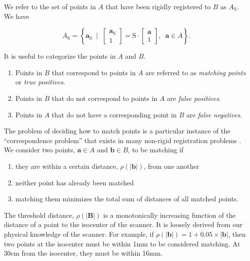 \documentclass[12pt]{article}
\begin{document}
We refer to the set of points in $A$ that have been rigidly registered to $B$ as $A_\textrm{S}$.  We have

\begin{equation*}
    A_\textrm{S} = \left\{ \mathbf{a}_\textrm{S} \;\; \Big| \;\; \begin{bmatrix} \mathbf{a}_\textrm{S} \\ 1 \end{bmatrix} = \mathrm{S} \cdot \begin{bmatrix} \mathbf{a} \\ 1 \end{bmatrix} , \;\; \mathbf{a} \in A \right\}.
\end{equation*}

It is useful to categorize the points in $A$ and $B$.

\begin{enumerate}
    \item Points in $B$ that correspond to points in $A$ are referred to as \textit{matching points} or \textit{true positives}.
    \item Points in $B$ that do not correspond to points in $A$ are \textit{false positives}.
    \item Points in $A$ that do not have a corresponding point in $B$ are \textit{false negatives}.
\end{enumerate}

The problem of deciding how to match points is a particular instance of the ``correspondence problem'' that exists in many non-rigid registration problems \cite{hill2001}.  We consider two points, $\textbf{a} \in A$ and $\textbf{b} \in B$, to be matching if

\begin{enumerate}
    \item they are within a certain distance, $\rho(|\textbf{b}|)$, from one another
    \item neither point has already been matched
    \item matching them minimizes the total sum of distances of all matched points.
\end{enumerate}

The threshold distance, $\rho(|\textbf{B}|)$ is a monotonically increasing function of the distance of a point to the isocenter of the scanner.  It is loosely derived from our physical knowledge of the scanner.  For example, if $\rho(|\textbf{b}|) = 1 + 0.05 \times |\textbf{b}|$, then two points at the isocenter must be within 1mm to be considered matching. At 30cm from the isocenter, they must be within 16mm.
\end{document}
